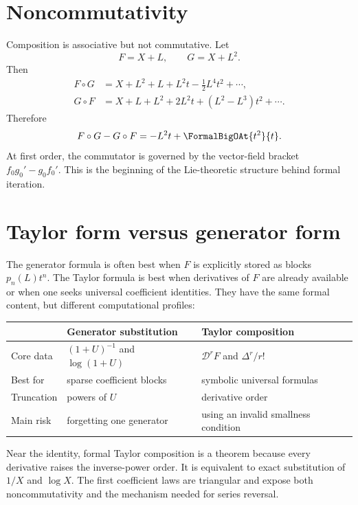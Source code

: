 \documentclass[11pt,oneside]{book}
\theoremstyle{definition}
\theoremstyle{remark}
\newcommand{\D}{\mathcal D}
\newcommand{\compose}{\mathbin{\circ}}
\begin{document}
\section{Noncommutativity}
Composition is associative but not commutative.  Let
\[
 F=X+L,
 \qquad
 G=X+L^2.
\]
Then
\begin{align*}
 F\compose G
 &=X+L^2+L+L^2t-\frac12L^4t^2+\cdots,\\
 G\compose F
 &=X+L+L^2+2L^2t+(L^2-L^3)t^2+\cdots.
\end{align*}
Therefore
\begin{equation}\label{eq:composition-noncommutative}
 F\compose G-G\compose F=-L^2t+\FormalBigOAt{t^2}{t}.
\end{equation}
At first order, the commutator is governed by the vector-field bracket
$f_0g_0'-g_0f_0'$.  This is the beginning of the Lie-theoretic structure
behind formal iteration.

\section{Taylor form versus generator form}
The generator formula is often best when $F$ is explicitly stored as blocks
$p_n(L)t^n$.  The Taylor formula is best when derivatives of $F$ are already
available or when one seeks universal coefficient identities.  They have the
same formal content, but different computational profiles:
\begin{center}
\begin{tabularx}{0.94\textwidth}{@{}lXX@{}}
\toprule
 & Generator substitution & Taylor composition \\
\midrule
Core data & $(1+U)^{-1}$ and $\log(1+U)$ & $\D^rF$ and $\Delta^r/r!$ \\
Best for & sparse coefficient blocks & symbolic universal formulas \\
Truncation & powers of $U$ & derivative order \\
Main risk & forgetting one generator & using an invalid smallness condition \\
\bottomrule
\end{tabularx}
\end{center}

\begin{summarybox}
Near the identity, formal Taylor composition is a theorem because every
derivative raises the inverse-power order.  It is equivalent to exact
substitution of $1/X$ and $\log X$.  The first coefficient laws are triangular
and expose both noncommutativity and the mechanism needed for series reversal.
\end{summarybox}
\end{document}
